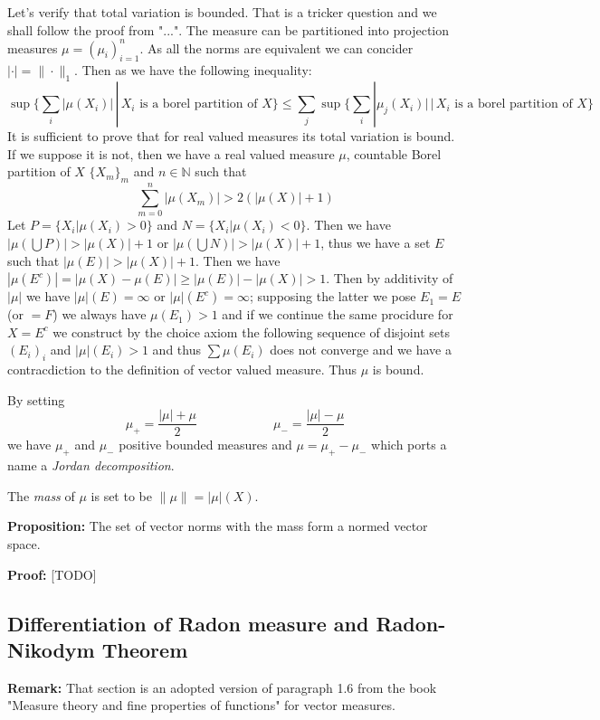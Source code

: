 \documentclass{article}
\begin{document}
\vspace{1ex}
Let's verify that total variation is bounded.
That is a tricker question and we
shall follow the proof from "...". The measure can be partitioned into projection measures
$\mu=(\mu_i)_{i=1}^n$. As all the norms are equivalent we can concider $|\cdot|
= \|\cdot\|_1$. Then as we have the following inequality:
\[\sup\{\sum_i|\mu(X_i)|\,|\,X_i\text{ is a borel partition of }X\} \leq \sum_j\sup\{\sum_i|\mu_j(X_i)|\,|\,X_i\text{ is a borel partition of }X\}\]
It is sufficient to prove that for real valued measures its total variation is bound.
If we suppose it is not, then we have a real valued measure $\mu$,
countable Borel partition of $X$ $\{X_m\}_m$ and $n\in\mathbb{N}$ such that
\[\sum_{m=0}^n|\mu(X_m)|>2(|\mu(X)|+1)\]
Let $P=\{X_i|\mu(X_i)>0\}$ and $N=\{X_i|\mu(X_i)<0\}$. Then
we have $|\mu(\bigcup P)|>|\mu(X)|+1$ or $|\mu(\bigcup N)|>|\mu(X)|+1$, thus we
have a set $E$ such that $|\mu(E)|>|\mu(X)|+1$. Then we have $|\mu(E^c)|=|\mu(X)
-\mu(E)|\geq |\mu(E)|-|\mu(X)|>1$. Then by additivity of $|\mu|$ we have
$|\mu|(E)=\infty$ or $|\mu|(E^c)=\infty$; supposing the latter we pose $E_1=E$
(or $=F$) we always have $\mu(E_1)>1$ and if we continue the same procidure for
$X=E^c$ we construct by the choice axiom the following sequence of disjoint sets
$(E_i)_i$ and $|\mu|(E_i)>1$ and thus $\sum\mu(E_i)$ does not converge and we
have a contracdiction to the definition of vector valued measure. Thus $\mu$
is bound.

\vspace{1ex}
By setting
\[\mu_+=\frac{|\mu|+\mu}{2}\quad\quad\quad\quad\quad\quad\mu_-=\frac{|\mu|-\mu}{2}\]
we have $\mu_+$ and $\mu_-$ positive bounded measures and $\mu=\mu_+-\mu_-$
which ports a name a \emph{Jordan decomposition}.


\vspace{1ex}
The \emph{mass} of $\mu$ is set to be $\|\mu\|=|\mu|(X)$.

\vspace{1ex}
\textbf{Proposition:}
The set of vector norms with the mass form a normed vector space.

\vspace{1ex}
\textbf{Proof:} [TODO]

\subsection{Differentiation of Radon measure and Radon-Nikodym Theorem}
\textbf{Remark:} That section is an adopted version of paragraph 1.6 from the
book "Measure theory and fine properties of functions" for vector measures.
\end{document}
